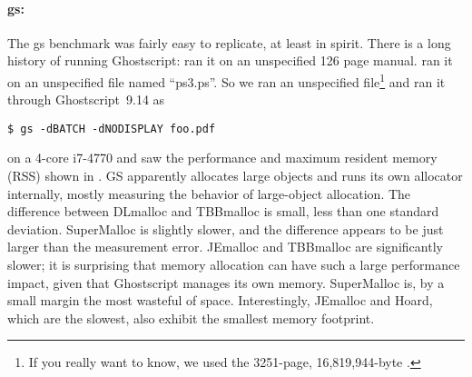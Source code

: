 \documentclass[pldi]{sigplanconf-pldi15}
\begin{document}
{\paragraph{gs:}} The gs benchmark was fairly easy to replicate, at
least in spirit.  There is a long history of running Ghostscript:
\cite{DetlefsDoZo94} ran it on an unspecified 126 page manual.
\cite{Evans06} ran it on an unspecified file named ``ps3.ps''.  So we
ran an unspecified file\footnote{If you really want to know, we used the 3251-page, 16,819,944-byte \cite{Intel13}.}
and ran it through Ghostscript~9.14 as
\begin{verbatim}
$ gs -dBATCH -dNODISPLAY foo.pdf
\end{verbatim}
on a 4-core i7-4770 and saw the performance and maximum resident
memory (RSS) shown in .  GS apparently allocates large
objects and runs its own allocator internally, mostly measuring the
behavior of large-object allocation.  The difference between DLmalloc
and TBBmalloc is small, less than one standard deviation.  SuperMalloc
is slightly slower, and the difference appears to be just larger than
the measurement error.  JEmalloc and TBBmalloc are significantly
slower; it is surprising that memory allocation can have such a large
performance impact, given that Ghostscript manages its own memory.
SuperMalloc is, by a small margin the most wasteful of space.
Interestingly, JEmalloc and Hoard, which are the slowest, also exhibit
the smallest memory footprint.
\end{document}
